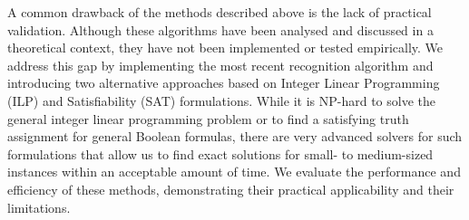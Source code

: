 A common drawback of the methods described above is the lack of practical validation. Although these algorithms have been analysed and discussed in a theoretical context, they have not been implemented or tested empirically. We address this gap by implementing the most recent recognition algorithm and introducing two alternative approaches based on Integer Linear Programming (ILP) and Satisfiability (SAT) formulations. While it is NP-hard to solve the general integer linear programming problem or to find a satisfying truth assignment for general Boolean formulas, there are very advanced solvers for such formulations that allow us to find exact solutions for small- to medium-sized instances within an acceptable amount of time. We evaluate the performance and efficiency of these methods, demonstrating their practical applicability and their limitations.
